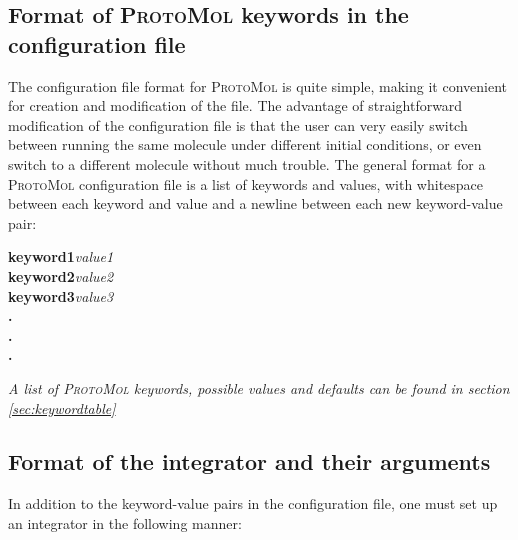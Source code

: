\documentclass[11pt]{report}
\newcommand{\ProtoMol}{\textsc{ProtoMol }}
\begin{document}

\subsection{Format of \ProtoMol keywords in the configuration file}

The configuration file format for \ProtoMol is quite simple, making it
convenient for creation and modification of the file.  The advantage
of straightforward modification of the configuration file is that the
user can very easily switch between running the same molecule under
different initial conditions, or even switch to a different molecule
without much trouble.  The general format for a \ProtoMol
configuration file is a list of keywords and values, with whitespace
between each keyword and value and a newline between each new
keyword-value pair:
\newline
\newline

{\bf keyword1}{\it \indent    value1}\\
{\bf \indent keyword2}{\it \indent   value2}\\
{\bf \indent keyword3}{\it \indent   value3}\\
{\bf \indent \indent \indent \indent  .}\\
{\bf \indent \indent \indent \indent  .}\\
{\bf \indent \indent \indent \indent  .}\\
\newline

{\it A list of \ProtoMol keywords, possible values and defaults can be found in section \ref{sec:keywordtable}}  


\subsection{Format of the integrator and their arguments}

In addition to the keyword-value pairs in the configuration file, one
must set up an integrator in the following manner: 
\end{document}
